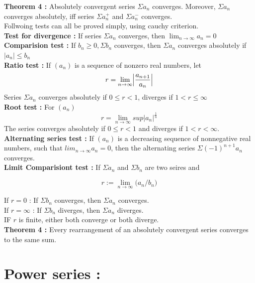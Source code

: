 \documentclass{report}
\begin{document}
\noindent \textbf{Theorem 4 :} Absolutely convergent series $\Sigma a_n$ converges. Moreover, $\Sigma a_n$ converges absolutely, iff series $\Sigma a_n^{+}$ and $\Sigma a_n^{-}$ converges.\\

Follwoing tests can all be proved simply, using cauchy criterion.\\

\noindent \textbf{Test for divergence :}  If series $\Sigma a_n$ converges, then $\lim_{n\to\infty} a_n = 0$ \\

\noindent \textbf{Comparision test :} If $b_n\ge0, \Sigma b_n$ converges, then $\Sigma a_n$ converges absolutely if $|a_n| \le b_n$\\

\noindent \textbf{Ratio test :} If $(a_n)$ is a sequence of nonzero real numbers, let 
$$ r = \lim_{n\to\infty}\Bigl|\frac{a_{n+1}}{a_n}\Bigr|$$
\noindent Series $\Sigma a_n$ converges absolutely if $0\le r<1$, diverges if $1<r\le \infty$\\

\noindent \textbf{Root test :} For $(a_n)$
$$ r = \lim_{n\to\infty} sup|a_n|^{\frac{1}{n}}$$
\noindent The series converges absolutely if $0\le r<1$ and diverges if $1<r<\infty$.\\

\noindent\textbf{Alternating series test :} If $(a_n)$ is a decreasing sequence of nonnegative real numbers, such that $lim_{n\to\infty}a_n=0$, then the alternating series $\Sigma (-1)^{n+1}a_n$ converges.\\

\noindent\textbf{Limit Comparisiont test :} If $\Sigma a_n$ and $\Sigma b_n$ are two seires and 

$$ r:= \lim_{n\to\infty}\big(a_n/b_n\big) $$

\noindent If $r=0$ : If $\Sigma b_n$ converges, then $\Sigma a_n$ converges.\\
\noindent If $r=\infty$ : If $\Sigma b_n$ diverges, then $\Sigma a_n$ diverges.\\
\noindent IF $r$ is finite, either both converge or both diverge.\\

\noindent\textbf{Theorem 4 :} Every rearrangement of an absolutely convergent series converges to the same sum.\\

\section{Power series :}
\end{document}
